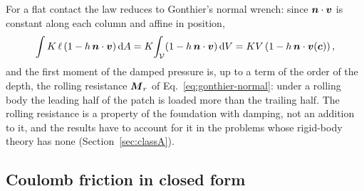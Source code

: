 For a flat contact the law reduces to Gonthier's normal wrench: since $\boldsymbol{n}\cdot\boldsymbol{v}$ is constant
along each column and affine in position,
\begin{equation}
  \int K\,\ell\,(1 - h\,\boldsymbol{n}\cdot\boldsymbol{v})\,\mathrm{d} A
  = K\!\int_{\mathcal{V}} (1 - h\,\boldsymbol{n}\cdot\boldsymbol{v})\,\mathrm{d} V
  = K V \left(1 - h\,\boldsymbol{n}\cdot\boldsymbol{v}(\boldsymbol{c})\right),
  \label{eq:reduction}
\end{equation}
and the first moment of the damped pressure is, up to a term of the order of the depth, the
rolling resistance $\boldsymbol{M}_r$ of Eq.~\eqref{eq:gonthier-normal}: under a rolling body the
leading half of the patch is loaded more than the trailing half. The rolling resistance is a
property of the foundation with damping, not an addition to it, and the results have to account
for it in the problems whose rigid-body theory has none (Section~\ref{sec:classA}).

\subsection{Coulomb friction in closed form}\label{sec:friction}

